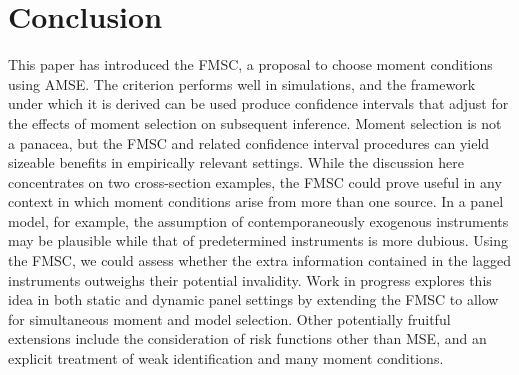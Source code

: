 \section{Conclusion}
\label{sec:conclude}
This paper has introduced the FMSC, a proposal to choose moment conditions using AMSE. 
The criterion performs well in simulations, and the framework under which it is derived can be used produce confidence intervals that adjust for the effects of moment selection on subsequent inference. 
Moment selection is not a panacea, but the FMSC and related confidence interval procedures can yield sizeable benefits in empirically relevant settings.
While the discussion here concentrates on two cross-section examples, the FMSC could prove useful in any context in which moment conditions arise from more than one source. 
In a panel model, for example, the assumption of contemporaneously exogenous instruments may be plausible while that of predetermined instruments is more dubious.
Using the FMSC, we could assess whether the extra information contained in the lagged instruments outweighs their potential invalidity. 
Work in progress explores this idea in both static and dynamic panel settings by extending the FMSC to allow for simultaneous moment and model selection.
Other potentially fruitful extensions include the consideration of risk functions other than MSE, and an explicit treatment of weak identification and many moment conditions.
